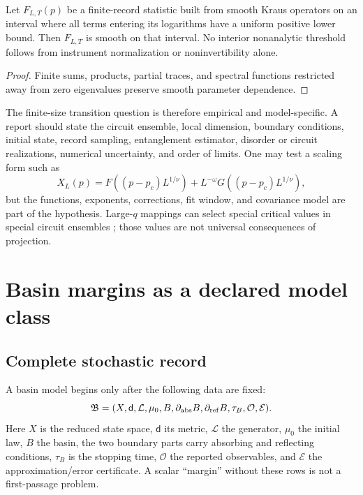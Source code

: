 \documentclass[11pt]{article}
\begin{document}
\begin{proposition}
\label{prop:no-knee}
Let $F_{L,T}(p)$ be a finite-record statistic built from smooth Kraus
operators on an interval where all terms entering its logarithms have a
uniform positive lower bound.  Then $F_{L,T}$ is smooth on that interval.
No interior nonanalytic threshold follows from instrument normalization
or noninvertibility alone.
\end{proposition}

\begin{proof}
Finite sums, products, partial traces, and spectral functions restricted
away from zero eigenvalues preserve smooth parameter dependence.
\end{proof}

The finite-size transition question is therefore empirical and
model-specific.  A report should state the circuit ensemble, local
dimension, boundary conditions, initial state, record sampling,
entanglement estimator, disorder or circuit realizations, numerical
uncertainty, and order of limits.  One may test a scaling form such as
\[
 X_L(p)=F\!\left((p-p_c)L^{1/\nu}\right)
 +L^{-\omega}G\!\left((p-p_c)L^{1/\nu}\right),
\]
but the functions, exponents, corrections, fit window, and covariance
model are part of the hypothesis.  Large-$q$ mappings can select special
critical values in special circuit ensembles \cite{bao2020}; those
values are not universal consequences of projection.

\section{Basin margins as a declared model class}

\subsection{Complete stochastic record}

A basin model begins only after the following data are fixed:
\begin{equation}\label{eq:basin-record}
 \mathfrak B=(X,\mathsf d,\mathcal L,\mu_0,B,\partial_{\rm abs}B,
 \partial_{\rm ref}B,\tau_B,\mathcal O,\mathcal E).
\end{equation}
Here $X$ is the reduced state space, $\mathsf d$ its metric,
$\mathcal L$ the generator, $\mu_0$ the initial law, $B$ the basin,
the two boundary parts carry absorbing and reflecting conditions,
$\tau_B$ is the stopping time, $\mathcal O$ the reported observables,
and $\mathcal E$ the approximation/error certificate.  A scalar
``margin'' without these rows is not a first-passage problem.
\end{document}
